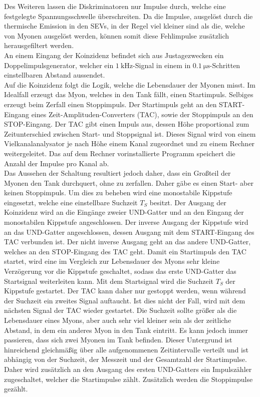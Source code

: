 Des Weiteren lassen die Diskriminatoren nur Impulse durch, welche eine festgelegte Spannungsschwelle überschreiten.
Da die Impulse, ausgelöst durch die thermische Emission in den SEVs, in der Regel viel kleiner sind als die, welche von Myonen ausgelöst werden, können somit diese Fehlimpulse zusätzlich herausgefiltert werden.\\
An einem Eingang der Koinzidenz befindet sich aus Justagezwecken ein Doppelimpulsgenerator, welcher ein $\SI{1}{\kilo\hertz}$-Signal in einem in $\SI{0,1}{\micro\second}$-Schritten einstellbaren Abstand aussendet.\\
Auf die Koinzidenz folgt die Logik, welche die Lebensdauer der Myonen misst.
Im Idealfall erzeugt das Myon, welches in den Tank fällt, einen Startimpuls.
Selbiges erzeugt beim Zerfall einen Stoppimpuls.
Der Startimpuls geht an den START-Eingang eines Zeit-Amplituden-Converters (TAC), sowie der Stoppimpuls an den STOP-Eingang.
Der TAC gibt einen Impuls aus, dessen Höhe proportional zum Zeitunterschied zwischen Start- und Stoppsignal ist.
Dieses Signal wird von einem Vielkanalanalysator je nach Höhe einem Kanal zugeordnet und zu einem Rechner weitergeleitet.
Das auf dem Rechner vorinstallierte Programm speichert die Anzahl der Impulse pro Kanal ab.\\
Das Aussehen der Schaltung resultiert jedoch daher, dass ein Großteil der Myonen den Tank durchquert, ohne zu zerfallen.
Daher gäbe es einen Start- aber keinen Stoppimpuls.
Um dies zu beheben wird eine monostabile Kippstufe eingesetzt, welche eine einstellbare Suchzeit $T_S$ besitzt.
Der Ausgang der Koinzidenz wird an die Eingänge zweier UND-Gatter und an den Eingang der monostabilen Kippstufe angeschlossen.
Der inverse Ausgang der Kippstufe wird an das UND-Gatter angeschlossen, dessen Ausgang mit dem START-Eingang des TAC verbunden ist.
Der nicht inverse Ausgang geht an das andere UND-Gatter, welches an den STOP-Eingang des TAC geht.
Damit ein Startimpuls den TAC startet, wird eine im Vergleich zur Lebensdauer des Myons sehr kleine Verzögerung vor die Kippstufe geschaltet, sodass das erste UND-Gatter das Startsignal weiterleiten kann.
Mit dem Startsignal wird die Suchzeit $T_S$ der Kippstufe gestartet.
Der TAC kann daher nur gestoppt werden, wenn während der Suchzeit ein zweites Signal auftaucht.
Ist dies nicht der Fall, wird mit dem nächsten Signal der TAC wieder gestartet.
Die Suchzeit sollte größer als die Lebensdauer eines Myons, aber auch sehr viel kleiner sein als der zeitliche Abstand, in dem ein anderes Myon in den Tank eintritt.
Es kann jedoch immer passieren, dass sich zwei Myonen im Tank befinden.
Dieser Untergrund ist hinreichend gleichmäßig über alle aufgenommenen Zeitintervalle verteilt und ist abhängig von der Suchzeit, der Messzeit und der Gesamtzahl der Startimpulse.
Daher wird zusätzlich an den Ausgang des ersten UND-Gatters ein Impulszähler zugeschaltet, welcher die Startimpulse zählt.
Zusätzlich werden die Stoppimpulse gezählt.
